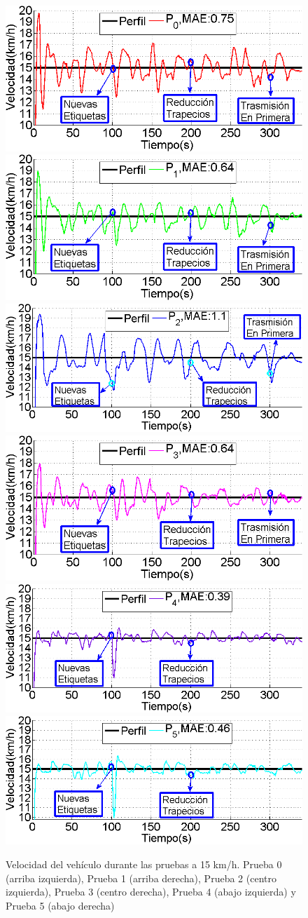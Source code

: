 \begin{figure}[h]
\centering
\includegraphics[width=0.45\linewidth]{figures/p0.png}\hspace{0.5cm}
\includegraphics[width=0.45\linewidth]{figures/p1.png}\\
\includegraphics[width=0.45\linewidth]{figures/p2.png}\hspace{0.5cm}
\includegraphics[width=0.45\linewidth]{figures/p3.png}\\
\includegraphics[width=0.45\linewidth]{figures/p5.png}\hspace{0.5cm}
\includegraphics[width=0.45\linewidth]{figures/final15.png}
\caption{Velocidad del vehículo durante las pruebas a 15 km/h. Prueba 0 (arriba izquierda), Prueba 1 (arriba derecha), Prueba 2 (centro izquierda), Prueba 3 (centro derecha), Prueba 4 (abajo izquierda) y Prueba 5 (abajo derecha)}
\label{fig:pruebas15}
\end{figure}


